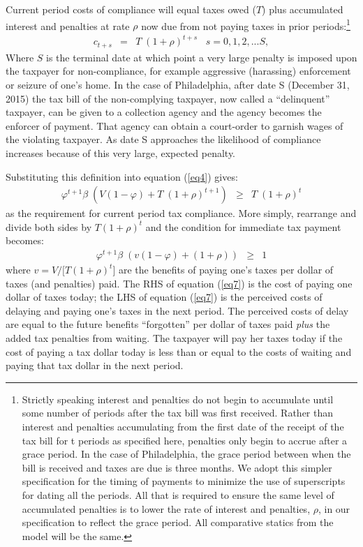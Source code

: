 Current period costs of compliance will equal taxes owed ($T$) plus
accumulated interest and penalties at rate $\rho$ now due from not
paying taxes in prior periods:\footnote{Strictly speaking interest and
  penalties do not begin to accumulate until some number of periods
  after the tax bill was first received. Rather than interest and
  penalties accumulating from the first date of the receipt of the tax
  bill for t periods as specified here, penalties only begin to accrue
  after a grace period.  In the case of Philadelphia, the grace period
  between when the bill is received and taxes are due is three months.
  We adopt this simpler specification for the timing of payments to
  minimize the use of superscripts for dating all the periods. All
  that is required to ensure the same level of accumulated penalties
  is to lower the rate of interest and penalties, $\rho$, in our
  specification to reflect the grace period. All comparative statics
  from the model will be the same. }
\begin{eqnarray}\label{eq5}
c_{t+s} &=& T \; (1 + \rho)^{t+s} \; \; \; s=0,1,2,...S,
\end{eqnarray}
Where $S$ is the terminal date at which point a very large penalty is
imposed upon the taxpayer for non-compliance, for example aggressive
(harassing) enforcement or seizure of one's home. In the case of
Philadelphia, after date S (December 31, 2015) the tax bill of the
non-complying taxpayer, now called a ``delinquent'' taxpayer, can be given to a collection agency and the
agency becomes the enforcer of payment. That agency can obtain a
court-order to garnish wages of the violating taxpayer. As date S
approaches the likelihood of compliance increases because of this very
large, expected penalty.

Substituting this definition into equation (\ref{eq4}) gives:  
\begin{eqnarray}\label{eq6}
\varphi^{t+1} \beta \; (V (1-\varphi) + T \; (1 + \rho)^{t+1}) &\ge&
  T \; (1 + \rho)^{t}
\end{eqnarray}
as the requirement for current period tax compliance.  More simply,
rearrange and divide both sides by $T(1 + \rho)^{t}$ and the condition
for immediate tax payment becomes:
\begin{eqnarray}\label{eq7}
\varphi^{t+1} \beta \;  (v (1-\varphi) +  (1 + \rho))  &\ge&   1
\end{eqnarray}
where $v = V/[T(1 + \rho)^{t}$] are the benefits of paying one's taxes
per dollar of taxes (and penalties) paid.  The RHS of equation
(\ref{eq7}) is the cost of paying one dollar of taxes today; the LHS
of equation (\ref{eq7}) is the perceived costs of delaying and paying
one's taxes in the next period.  The perceived costs of delay are
equal to the future benefits ``forgotten'' per dollar of taxes paid
\textit{plus} the added tax penalties from waiting.  The taxpayer will
pay her taxes today if the cost of paying a tax dollar today is less
than or equal to the costs of waiting and paying that tax dollar in
the next period.

